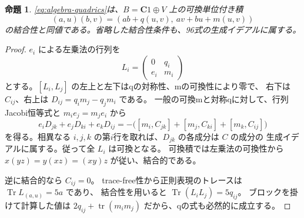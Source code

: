 \documentclass[11pt,a4paper]{ltjsarticle}
\newcommand{\CC}{\mathbf C}
\DeclareMathOperator{\tr}{tr}
\newtheorem{proposition}[theorem]{命題}
\theoremstyle{remark}
\begin{document}
\begin{proposition}\label{prop:associative}
\eqref{eq:algebra-quadrics}は、$B=\CC1\oplus V$ 上の可換単位付き積
\begin{equation}\label{eq:algebra-product}
 (a,u)(b,v)=(ab+q(u,v),\ av+bu+m(u,v))
\end{equation}
の結合性と同値である。省略した結合性条件も、96式の生成イデアルに属する。
\end{proposition}
\begin{proof}
$e_i$ による左乗法の行列を
\[
 L_i=\begin{pmatrix}0&q_i\\ e_i&m_i\end{pmatrix}
\]
とする。$[L_i,L_j]$ の左上と左下はqの対称性、mの可換性により零で、
右下は $C_{ij}$、右上は $D_{ij}=q_i m_j-q_jm_i$ である。
一般の可換mと対称qに対して、行列Jacobi恒等式と $m_i e_j=m_j e_i$ から
\[
 e_iD_{jk}+e_jD_{ki}+e_kD_{ij}
 =-\bigl([m_i,C_{jk}]+[m_j,C_{ki}]+[m_k,C_{ij}]\bigr)
\]
を得る。相異なる $i,j,k$ の第$i$行を取れば、$D_{jk}$ の各成分は $C$ の成分の
生成イデアルに属する。従って全 $L_i$ は可換となる。
可換積では左乗法の可換性から $x(yz)=y(xz)=(xy)z$ が従い、結合的である。

逆に結合的なら $C_{ij}=0$。
trace-free性から正則表現のトレースは $\operatorname{Tr}L_{(a,u)}=5a$ であり、
結合性を用いると $\operatorname{Tr}(L_iL_j)=5q_{ij}$。
ブロックを掛けて計算した値は $2q_{ij}+\tr(m_i m_j)$ だから、qの式も必然的に成立する。
\end{proof}
\end{document}
